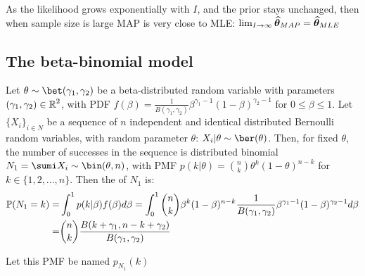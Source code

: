 As the likelihood grows exponentially with $I$, and the prior stays unchanged, then when sample size is large MAP is very close to MLE: $\lim_{I\rightarrow\infty}\widehat{\vb*{\theta}}_{MAP}=\widehat{\vb*{\theta}}_{MLE}$ \medskip























\subsection{The beta-binomial model}
Let  $\theta\sim\bet(\gamma_1,\gamma_2)$ be a beta-distributed random variable with parameters $(\gamma_1,\gamma_2)\in\operatorname{\mathbb{R}}^2$, with PDF $f(\beta)=\frac{1}{B(\gamma_1,\gamma_2)}\beta^{\gamma_1-1}(1-\beta)^{\gamma_2-1}$ for $0\leq\beta\leq 1$. Let $\{X_i\}_{i\in N}$ be a sequence of $n$ independent and identical distributed Bernoulli random variables, with random parameter $\theta$: $X_i|\theta\sim\ber(\theta)$. Then, for fixed $\theta$, the number of successes in the sequence is distributed binomial $N_1=\sumi X_i\sim \bin(\theta,n)$, with PMF $p(k|\theta)=\binom{n}{k}\theta^k(1-\theta)^{n-k}$ for $k\in\{1, 2,..., n\}$. Then the  of $N_1$ is: 
\begin{align*}
    \operatorname{\mathbb{P}}(N_1=k) =& \int_{0}^{1} p(k|\beta)f(\beta)d\beta=\int_{0}^{1}\binom{n}{k}\beta^k(1-\beta)^{n-k}\frac{1}{B(\gamma_1,\gamma_2)}\beta^{\gamma_1-1}(1-\beta)^{\gamma_2-1}d\beta\\
    =& \binom{n}{k}\frac{B(k+\gamma_1, n-k+\gamma_2)}{B(\gamma_1,\gamma_2)}
\end{align*}

Let this PMF be named $p_{N_1}(k)$

